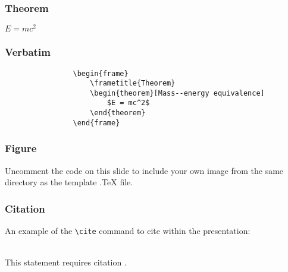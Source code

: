 \documentclass[12pt]{beamer}
\begin{document}

        \begin{frame}
            \frametitle{Theorem}
            \begin{theorem}
                $E = mc^2$
            \end{theorem}
        \end{frame}


        \begin{frame}[fragile] %
            \frametitle{Verbatim}
            \begin{example}
                \begin{verbatim}
                \begin{frame}
                    \frametitle{Theorem}
                    \begin{theorem}[Mass--energy equivalence]
                        $E = mc^2$
                    \end{theorem}
                \end{frame}\end{verbatim}
                \end{example}
            \end{frame}


            \begin{frame}
                \frametitle{Figure}
                Uncomment the code on this slide to include your own image from the same directory as the template .TeX file.
            \end{frame}


            \begin{frame}[fragile] %
                \frametitle{Citation}
                An example of the \verb|\cite| command to cite within the presentation:\\~

                This statement requires citation \cite{p1}.
            \end{frame}
\end{document}
